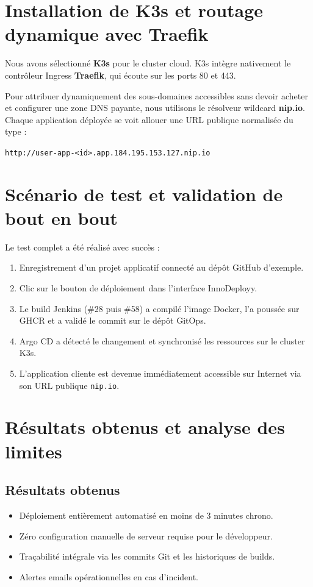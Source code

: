\documentclass[12pt,a4paper,oneside]{report}
\begin{document}
\section{Installation de K3s et routage dynamique avec Traefik}
Nous avons sélectionné \textbf{K3s} pour le cluster cloud. K3s intègre nativement le contrôleur Ingress \textbf{Traefik}, qui écoute sur les ports 80 et 443.

Pour attribuer dynamiquement des sous-domaines accessibles sans devoir acheter et configurer une zone DNS payante, nous utilisons le résolveur wildcard \textbf{nip.io}. Chaque application déployée se voit allouer une URL publique normalisée du type :
\begin{center}
\texttt{http://user-app-<id>.app.184.195.153.127.nip.io}
\end{center}

\section{Scénario de test et validation de bout en bout}
Le test complet a été réalisé avec succès :
\begin{enumerate}
    \item Enregistrement d'un projet applicatif connecté au dépôt GitHub d'exemple.
    \item Clic sur le bouton de déploiement dans l'interface InnoDeployy.
    \item Le build Jenkins (\#28 puis \#58) a compilé l'image Docker, l'a poussée sur GHCR et a validé le commit sur le dépôt GitOps.
    \item Argo CD a détecté le changement et synchronisé les ressources sur le cluster K3s.
    \item L'application cliente est devenue immédiatement accessible sur Internet via son URL publique \texttt{nip.io}.
\end{enumerate}

\section{Résultats obtenus et analyse des limites}
\subsection{Résultats obtenus}
\begin{itemize}[label=$\checkmark$]
    \item Déploiement entièrement automatisé en moins de 3 minutes chrono.
    \item Zéro configuration manuelle de serveur requise pour le développeur.
    \item Traçabilité intégrale via les commits Git et les historiques de builds.
    \item Alertes emails opérationnelles en cas d'incident.
\end{itemize}
\end{document}
